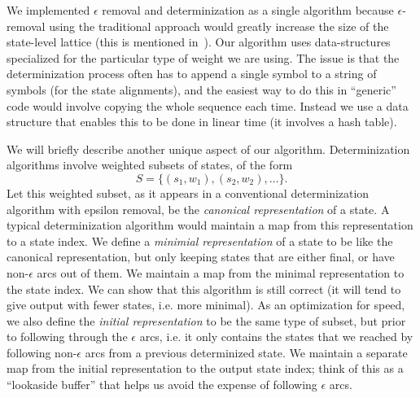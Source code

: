 \documentclass{article}
\begin{document}
We implemented $\epsilon$ removal and determinization as a single algorithm 
because $\epsilon$-removal using the traditional approach would greatly
increase the size of the state-level lattice (this is mentioned 
in~\cite{efficient_general}).  Our algorithm uses data-structures
specialized for the particular type of weight we are using.  The issue
is that the determinization process often has to append a single symbol to
a string of symbols (for the state alignments), and the easiest way to
do this in ``generic'' code would involve copying the whole sequence each time.
Instead we use a data structure that enables this to be done in linear
time (it involves a hash table).  

We will briefly describe another unique aspect of our
algorithm.  Determinization algorithms involve weighted subsets of states,
of the form
\begin{equation}
   S = \{ (s_1, w_1), (s_2, w_2), \ldots \} .
\end{equation}
Let this weighted subset, as it appears in a conventional determinization
algorithm with epsilon removal, be the {\em canonical representation} of a state.
A typical determinization algorithm would maintain a map from this representation
to a state index.  We define a {\em minimial representation} of a state
to be like the canonical representation, but only keeping states that
are either final, or have non-$\epsilon$ arcs out of them.  We maintain
a map from the minimal representation to the state index.  We can
show that this algorithm is still correct (it will tend to give output
with fewer states, i.e. more minimal).  As an optimization for speed, we also define
the {\em initial representation} to be the same type of subset, but prior
to following through the $\epsilon$ arcs, i.e. it only contains the states
that we reached by following non-$\epsilon$ arcs from a previous determinized
state.  We maintain a separate map from the initial representation to
the output state index; think of this as a ``lookaside buffer'' that helps us
avoid the expense of following $\epsilon$ arcs. 
\end{document}
